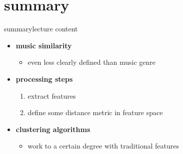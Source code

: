     \section{summary}
        \begin{frame}{summary}{lecture content}
            \begin{itemize}
                \item   \textbf{music similarity}
                    \begin{itemize}
                        \item   even less clearly defined than music genre
                    \end{itemize}
                \bigskip
                \item   \textbf{processing steps}
                    \begin{enumerate}
                        \item   extract features
                        \item   define some distance metric in feature space
                    \end{enumerate}
                \bigskip
                \item   \textbf{clustering algorithms}
                    \begin{itemize}
                        \item   work to a certain degree with traditional features
                    \end{itemize}
            \end{itemize}
        \end{frame}

